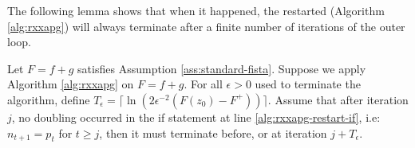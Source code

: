 \documentclass[12pt]{report}
\begin{document}
        The following lemma shows that when it happened, the restarted \XXAPG{} (Algorithm \ref{alg:rxxapg}) will always terminate after a finite number of iterations of the outer loop. 
        \begin{lemma}\label{lemma:rxxapg-outer-itr-bnd}
            Let $F = f + g$ satisfies Assumption \ref{ass:standard-fista}. 
            Suppose we apply Algorithm \ref{alg:rxxapg} on $F = f + g$. 
            For all $\epsilon > 0$ used to terminate the algorithm, define $T_\epsilon = \lceil\ln(2\epsilon^{-2}(F(z_0) - F^+))\rceil$. 
            Assume that after iteration $j$, no doubling occurred in the if statement at line \ref{alg:rxxapg-restart-if}, i.e: $n_{t + 1} = p_t$ for $t \ge j$, then it must terminate before, or at iteration $j + T_\epsilon$. 
        \end{lemma}
\end{document}
